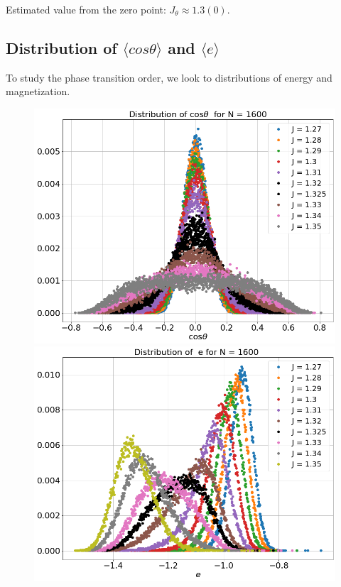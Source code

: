 Estimated value from the zero point: $J_{\theta} \approx 1.3(0)$.



\subsection{Distribution of $\langle cos \theta \rangle$ and $\langle e \rangle$ } \label{sec:distributions}
To study the phase transition order, we look to distributions of energy and magnetization. 
  \begin{figure}[H]
 	\centering
 	\includegraphics[scale=0.25]{Images/distr_cos_1600.png}
 	\includegraphics[scale=0.25]{Images/distr_energy_1600.png} \\

\end{figure}
